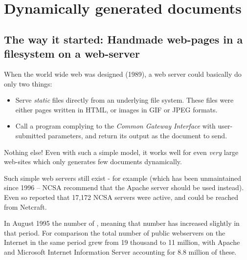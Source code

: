 

\chapter{Dynamically generated documents}
\label{cha:dynamically-generated-documents}




\section{The way it started: Handmade web-pages in a
  filesystem on a web-server}

When the world wide web was designed (1989), a web server could
basically do only two things:



\begin{itemize}
\item Serve \textit{static} files directly from an underlying file
  system.  These files were either pages written in HTML, or images in
  GIF or JPEG formats.

\item Call a program complying to the \textit{Common Gateway
    Interface} with user-submitted parameters, and return its output
  as the document to send.
\end{itemize}

Nothing else! Even with such a simple model, it works well for even
\textit{very} large web-sites which only generates few documents
dynamically.




Such simple web servers still exist - for example
 (which has been
unmaintained since 1996 -- NCSA recommend that the Apache server
should be used instead).  Even so
 reported that 17,172 NCSA servers were active, and
could be reached from Netcraft.

In August 1995 the number of
, meaning that number has
increased slightly in that period.  For comparison the total number of
public webservers on the Internet in the same period grew from 19
thousand to 11 million, with Apache and Microsoft Internet Information
Server accounting for 8.8 million of these.
  
